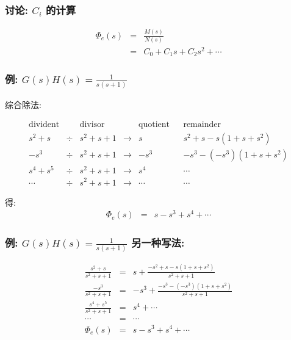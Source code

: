 \documentclass{beamer}
\begin{document}
\begin{frame}
\frametitle{讨论: $C_i$ 的计算}
\label{sec-3-4}

\begin{eqnarray*}
\Phi_e(s) &=& \frac{M(s)}{N(s)} \\
 & = & C_0+C_1s+C_2s^2+\cdots
\end{eqnarray*}
\end{frame}
\begin{frame}
\frametitle{例: $G(s)H(s)=\frac{1}{s(s+1)}$}
\label{sec-3-5}


综合除法:

\[
\begin{matrix}
\text{divident}      &      &   \text{divisor}  &    & \text{quotient} &   & \text{remainder} \\  
s^2+s             &\div  &    s^2+s+1     & \rightarrow &  s       &  & s^2+s-s(1+s+s^2) \\
-s^3             &\div  &   s^2+s+1       & \rightarrow  & -s^3     &   & -s^3-(-s^3)(1+s+s^2)\\
 s^4+s^5         &\div  &  s^ 2+s+1       & \rightarrow & s^4  &   & \cdots  \\
\cdots           &\div   &  s^2+s+1       &\rightarrow  & \cdots   &    &\cdots   
\end{matrix}
\]

得:
\begin{eqnarray*}
\Phi_e(s)  &=& s-s^3+s^4+\cdots
\end{eqnarray*}
\end{frame}
\begin{frame}
\frametitle{例: $G(s)H(s)=\frac{1}{s(s+1)}$ 另一种写法:}
\label{sec-3-6}


\begin{eqnarray*}
\frac{s^2+s}{s^2+s+1} & = & s + \frac{-s^2+s-s(1+s+s^2)}{s^2+s+1}  \\
\frac{-s^3}{s^2+s+1}  & = & -s^3+\frac{-s^3-(-s^3)(1+s+s^2)}{s^2+s+1}\\
\frac{s^4+s^5}{s^2+s+1} &=& s^4 +\cdots \\
\cdots                  &=& \cdots \\
\Phi_e(s)               &=& s-s^3+s^4+\cdots
\end{eqnarray*}
\end{frame}
\end{document}
